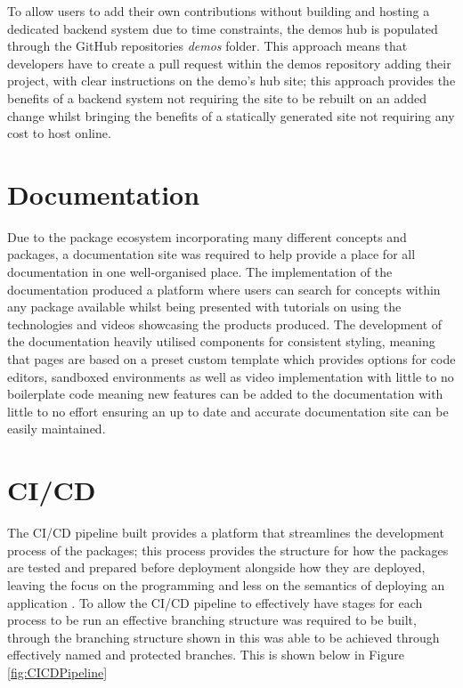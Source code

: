 \documentclass{l4proj}
\begin{document}
To allow users to add their own contributions without building and hosting a dedicated backend system due to time constraints, the demos hub is populated through the GitHub repositories \textit{demos} folder. This approach means that developers have to create a pull request within the demos repository adding their project, with clear instructions on the demo's hub site; this approach provides the benefits of a backend system not requiring the site to be rebuilt on an added change whilst bringing the benefits of a statically generated site not requiring any cost to host online.

\section{Documentation}
Due to the package ecosystem incorporating many different concepts and packages, a documentation site was required to help provide a place for all documentation in one well-organised place. The implementation of the documentation produced a platform where users can search for concepts within any package available whilst being presented with tutorials on using the technologies and videos showcasing the products produced. The development of the documentation heavily utilised components for consistent styling, meaning that pages are based on a preset custom template which provides options for code editors, sandboxed environments as well as video implementation with little to no boilerplate code meaning new features can be added to the documentation with little to no effort ensuring an up to date and accurate documentation site can be easily maintained.

\section{CI/CD}
The CI/CD pipeline built provides a platform that streamlines the development process of the packages; this process provides the structure for how the packages are tested and prepared before deployment alongside how they are deployed, leaving the focus on the programming and less on the semantics of deploying an application \cite{CICD}. To allow the CI/CD pipeline to effectively have stages for each process to be run an effective branching structure was required to be built, through the branching structure shown in \cite{FeatureBranching} this was able to be achieved through effectively named and protected branches. This is shown below in Figure \ref{fig:CICDPipeline}  
\end{document}
